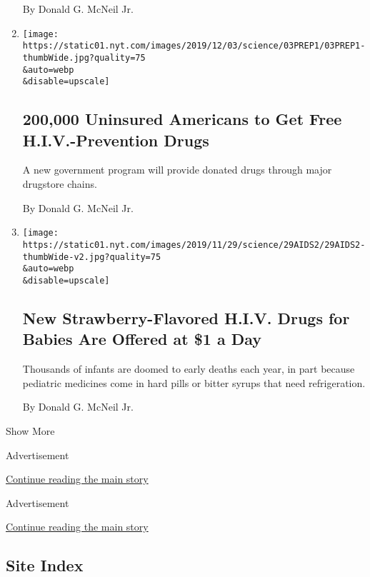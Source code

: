 \begin{enumerate}
  By Donald G. McNeil Jr.
\item
  \href{/2019/12/03/health/truvada-prep-hiv-gilead.html}{}

  \texttt{[image: https://static01.nyt.com/images/2019/12/03/science/03PREP1/03PREP1-thumbWide.jpg?quality=75\\\&auto=webp\\\&disable=upscale]}

  \hypertarget{200000-uninsured-americans-to-get-free-hiv-prevention-drugs}{%
  \subsection{200,000 Uninsured Americans to Get Free H.I.V.-Prevention
  Drugs}\label{200000-uninsured-americans-to-get-free-hiv-prevention-drugs}}

  A new government program will provide donated drugs through major
  drugstore chains.

  By Donald G. McNeil Jr.
\item
  \href{/2019/11/29/health/AIDS-drugs-children.html}{}

  \texttt{[image: https://static01.nyt.com/images/2019/11/29/science/29AIDS2/29AIDS2-thumbWide-v2.jpg?quality=75\\\&auto=webp\\\&disable=upscale]}

  \hypertarget{new-strawberry-flavored-hiv-drugs-for-babies-are-offered-at-1-a-day}{%
  \subsection{New Strawberry-Flavored H.I.V. Drugs for Babies Are
  Offered at \$1 a
  Day}\label{new-strawberry-flavored-hiv-drugs-for-babies-are-offered-at-1-a-day}}

  Thousands of infants are doomed to early deaths each year, in part
  because pediatric medicines come in hard pills or bitter syrups that
  need refrigeration.

  By Donald G. McNeil Jr.
\end{enumerate}

Show More

Advertisement

\protect\hyperlink{after-mid1}{Continue reading the main story}

Advertisement

\protect\hyperlink{after-mktg}{Continue reading the main story}

\hypertarget{site-index}{%
\subsection{Site Index}\label{site-index}}

